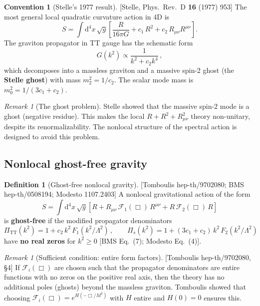 \documentclass[12pt,a4paper]{article}
\theoremstyle{definition}
\newtheorem{definition}[proposition]{Definition}
\newtheorem{convention}[proposition]{Convention}
\theoremstyle{remark}
\newtheorem{remark}[proposition]{Remark}
\newcommand{\Ricsq}{R_{\mu\nu}R^{\mu\nu}}
\newcommand{\dd}{\mathrm{d}}
\newcommand{\fromlit}[1]{\textcolor{blue!70!black}{\textsf{[#1]}}}
\begin{document}
\begin{convention}[Stelle's 1977 result]
\label{conv:stelle}
\fromlit{Stelle, Phys.\ Rev.\ D \textbf{16} (1977) 953}
The most general local quadratic curvature action in 4D is
\begin{equation}
  S = \int\dd^4x\,\sqrt{g}\left[
    \frac{R}{16\pi G} + c_1\, R^2 + c_2\, \Ricsq
  \right].
  \label{eq:stelle-action}
\end{equation}
The graviton propagator in TT gauge has the schematic form
\begin{equation}
  G(k^2) \propto \frac{1}{k^2 + c_2 k^4}\,,
\end{equation}
which decomposes into a massless graviton and a massive spin-2 ghost
(the \textbf{Stelle ghost}) with mass $m_2^2 = 1/c_2$.
The scalar mode mass is $m_0^2 = 1/(3c_1+c_2)$.
\end{convention}

\begin{remark}[The ghost problem]
Stelle showed that the massive spin-2 mode is a ghost
(negative residue).  This makes the local $R + R^2 + R_{\mu\nu}^2$
theory non-unitary, despite its renormalizability.  The nonlocal
structure of the spectral action is designed to avoid this problem.
\end{remark}


\subsection{Nonlocal ghost-free gravity}

\begin{definition}[Ghost-free nonlocal gravity]
\fromlit{Tomboulis hep-th/9702080; BMS hep-th/0508194;
Modesto 1107.2403}
A nonlocal gravitational action of the form
\begin{equation}
  S = \int\dd^4x\,\sqrt{g}\left[
    R + R_{\mu\nu}\,\mathcal{F}_1(\Box)\,R^{\mu\nu}
    + R\,\mathcal{F}_2(\Box)\,R
  \right]
  \label{eq:nonlocal-action}
\end{equation}
is \textbf{ghost-free} if the modified propagator denominators
\begin{equation}
  \Pi_{\text{TT}}(k^2) = 1 + c_2\, k^2\, F_1(k^2/\Lambda^2)\,,
  \qquad
  \Pi_s(k^2) = 1 + (3c_1+c_2)\, k^2\, F_2(k^2/\Lambda^2)
\end{equation}
have \textbf{no real zeros} for $k^2 \geq 0$
\fromlit{BMS Eq.~(7); Modesto Eq.~(4)}.
\end{definition}

\begin{remark}[Sufficient condition: entire form factors]
\fromlit{Tomboulis hep-th/9702080, \S4}
If $\mathcal{F}_i(\Box)$ are chosen such that the propagator
denominators are entire functions with no zeros on the positive
real axis, then the theory has no additional poles (ghosts) beyond
the massless graviton.  Tomboulis showed that choosing
$\mathcal{F}_i(\Box) = e^{H(-\Box/M^2)}$ with $H$ entire and
$H(0) = 0$ ensures this.
\end{remark}
\end{document}
